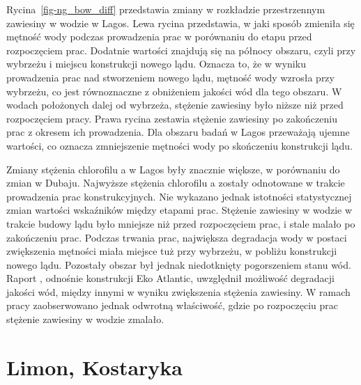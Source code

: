 \documentclass{amuthesis}
\begin{document}
Rycina~\ref{fig-ng_bow_diff} przedstawia zmiany w rozkładzie
przestrzennym zawiesiny w wodzie w Lagos. Lewa rycina przedstawia, w
jaki sposób zmieniła się mętność wody podczas prowadzenia prac w
porównaniu do etapu przed rozpoczęciem prac. Dodatnie wartości znajdują
się na północy obszaru, czyli przy wybrzeżu i miejscu konstrukcji nowego
lądu. Oznacza to, że w wyniku prowadzenia prac nad stworzeniem nowego
lądu, mętność wody wzrosła przy wybrzeżu, co jest równoznaczne z
obniżeniem jakości wód dla tego obszaru. W wodach położonych dalej od
wybrzeża, stężenie zawiesiny było niższe niż przed rozpoczęciem pracy.
Prawa rycina zestawia stężenie zawiesiny po zakończeniu prac z okresem
ich prowadzenia. Dla obszaru badań w Lagos przeważają ujemne wartości,
co oznacza zmniejszenie mętności wody po skończeniu konstrukcji lądu.

Zmiany stężenia chlorofilu a w Lagos były znacznie większe, w porównaniu
do zmian w Dubaju. Najwyższe stężenia chlorofilu a zostały odnotowane w
trakcie prowadzenia prac konstrukcyjnych. Nie wykazano jednak istotności
statystycznej zmian wartości wskaźników między etapami prac. Stężenie
zawiesiny w wodzie w trakcie budowy lądu było mniejsze niż przed
rozpoczęciem prac, i stale malało po zakończeniu prac. Podczas trwania
prac, największa degradacja wody w postaci zwiększenia mętności miała
miejsce tuż przy wybrzeżu, w pobliżu konstrukcji nowego lądu. Pozostały
obszar był jednak niedotknięty pogorszeniem stanu wód. Raport
\textcite{EkoAtlantic2012}, odnośnie konstrukcji Eko Atlantic,
uwzględnił możliwość degradacji jakości wód, między innymi w wyniku
zwiększenia stężenia zawiesiny. W ramach pracy zaobserwowano jednak
odwrotną właściwość, gdzie po rozpoczęciu prac stężenie zawiesiny w
wodzie zmalało.

\hypertarget{limon-kostaryka-1}{%
\section{Limon, Kostaryka}\label{limon-kostaryka-1}}
\end{document}
